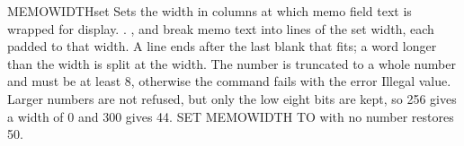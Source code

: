\begin{XbaseEntry}{MEMOWIDTH}{set}
Sets the width in columns at which memo field text is wrapped for display.
\Syntax
{}
.
\Usage
{},  and  break memo text into lines of the set
width, each padded to that width.  A line ends after the last blank that fits;
a word longer than the width is split at the width.  The number is truncated to
a whole number and must be at least 8, otherwise the command fails with the
error Illegal value.  Larger numbers are not refused, but only the low eight
bits are kept, so 256 gives a width of 0 and 300 gives 44.  SET MEMOWIDTH TO
with no number restores 50.
\end{XbaseEntry}
